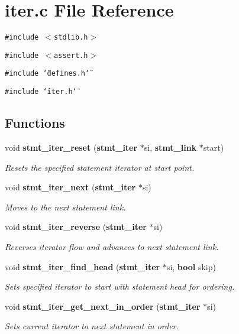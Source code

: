 \section{iter.c File Reference}
\label{iter_8c}
{\tt \#include $<$stdlib.h$>$}\par
{\tt \#include $<$assert.h$>$}\par
{\tt \#include \char`\"{}defines.h\char`\"{}}\par
{\tt \#include \char`\"{}iter.h\char`\"{}}\par
\subsection*{Functions}
\begin{CompactItemize}
\item 
void {\bf stmt\_\-iter\_\-reset} ({\bf stmt\_\-iter} $\ast$si, {\bf stmt\_\-link} $\ast$start)
\begin{CompactList}\small\item\em Resets the specified statement iterator at start point. \item\end{CompactList}\item 
void {\bf stmt\_\-iter\_\-next} ({\bf stmt\_\-iter} $\ast$si)
\begin{CompactList}\small\item\em Moves to the next statement link. \item\end{CompactList}\item 
void {\bf stmt\_\-iter\_\-reverse} ({\bf stmt\_\-iter} $\ast$si)
\begin{CompactList}\small\item\em Reverses iterator flow and advances to next statement link. \item\end{CompactList}\item 
void {\bf stmt\_\-iter\_\-find\_\-head} ({\bf stmt\_\-iter} $\ast$si, {\bf bool} skip)
\begin{CompactList}\small\item\em Sets specified iterator to start with statement head for ordering. \item\end{CompactList}\item 
void {\bf stmt\_\-iter\_\-get\_\-next\_\-in\_\-order} ({\bf stmt\_\-iter} $\ast$si)
\begin{CompactList}\small\item\em Sets current iterator to next statement in order. \item\end{CompactList}\end{CompactItemize}


